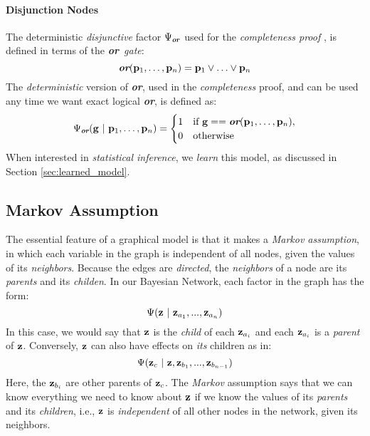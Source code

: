 \documentclass[11pt]{article}
\newcommand{\zvariable}{{\bf z}}
\newcommand{\pvariable}{{\bf p}}
\newcommand{\gvariable}{{\bf g}}
\newcommand{\condsep}{\ |\ }
\newcommand{\opor}{\textbf{\em or}}
\begin{document}
\paragraph{Disjunction Nodes}
The deterministic {\em disjunctive} factor $\Psi_{\opor}$ used for the {\em completeness proof} \cite{Coppola2024}, is defined in terms of the {\em \opor\ gate}:
\begin{equation} 
    \opor(\pvariable_1, \ldots, \pvariable_n) = \pvariable_1 \vee \ldots \vee \pvariable_n 
\end{equation}
The {\em deterministic} version of \opor, used in the {\em completeness} proof, and can be used any time we want exact logical \opor, is defined as:
\begin{equation}
    \Psi_{\opor}(\gvariable \condsep \pvariable_1, \ldots, \pvariable_n) = 
    \begin{cases} 
        1 & \text{if } \gvariable == \opor(\pvariable_1, \ldots, \pvariable_n), \\
        0 & \text{otherwise}
    \end{cases}
\end{equation}
When interested in {\em statistical inference}, we {\em learn} this model, as discussed in Section \ref{sec:learned_model}.

\subsection{Markov Assumption}
The essential feature of a graphical model is that it makes a {\em Markov assumption}, in which each variable in the graph is independent of all nodes, given the values of its {\em neighbors}.
Because the edges are {\em directed}, the {\em neighbors} of a node are its {\em parents} and its {\em childen}.
In our Bayesian Network, each factor in the graph has the form:
\begin{equation} \Psi(\zvariable \condsep \zvariable_{a_1}, ..., \zvariable_{a_n}) \end{equation}
In this case, we would say that $\zvariable$ is the {\em child} of each $\zvariable_{a_i}$ and each $\zvariable_{a_i}$ is a {\em parent} of $\zvariable$.
Conversely, $\zvariable$ can also have effects on {\em its} children as in:
\begin{equation} \Psi(\zvariable_c \condsep \zvariable, \zvariable_{b_1}, ..., \zvariable_{b_{n-1}}) \end{equation}
Here, the $\zvariable_{b_i}$ are other parents of $\zvariable_c$.
The {\em Markov} assumption says that we can know everything we need to know about $\zvariable$ if we know the values of its {\em parents} and its {\em children}, i.e., $\zvariable$ is {\em independent} of all other nodes in the network, given its neighbors.
\end{document}
